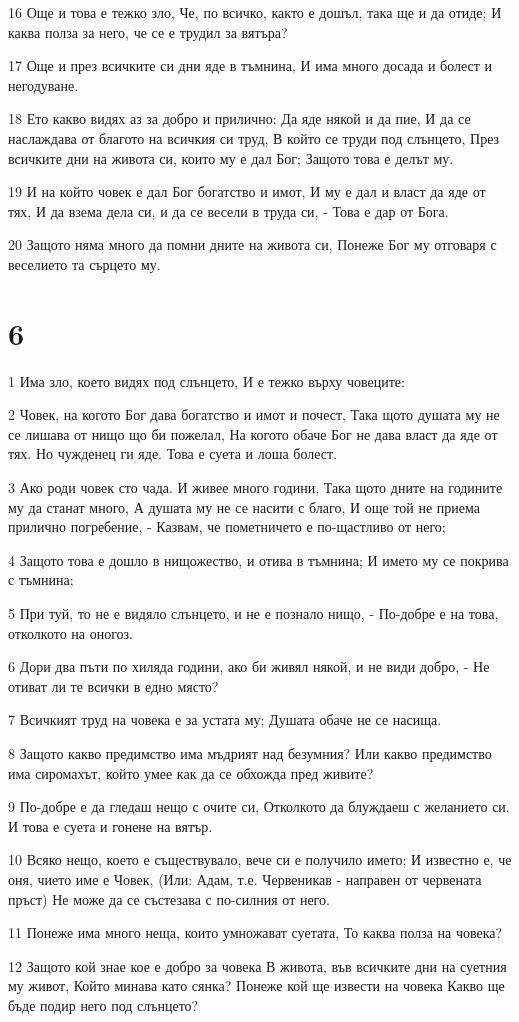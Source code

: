 \par 16 Още и това е тежко зло, Че, по всичко, както е дошъл, така ще и да отиде; И каква полза за него, че се е трудил за вятъра?
\par 17 Още и през всичките си дни яде в тъмнина, И има много досада и болест и негодуване.
\par 18 Ето какво видях аз за добро и прилично: Да яде някой и да пие, И да се наслаждава от благото на всичкия си труд, В който се труди под слънцето, През всичките дни на живота си, които му е дал Бог; Защото това е делът му.
\par 19 И на който човек е дал Бог богатство и имот, И му е дал и власт да яде от тях, И да взема дела си, и да се весели в труда си, - Това е дар от Бога.
\par 20 Защото няма много да помни дните на живота си, Понеже Бог му отговаря с веселието та сърцето му.

\chapter{6}

\par 1 Има зло, което видях под слънцето, И е тежко върху човеците:
\par 2 Човек, на когото Бог дава богатство и имот и почест, Така щото душата му не се лишава от нищо що би пожелал, На когото обаче Бог не дава власт да яде от тях. Но чужденец ги яде. Това е суета и лоша болест.
\par 3 Ако роди човек сто чада. И живее много години, Така щото дните на годините му да станат много, А душата му не се насити с благо, И още той не приема прилично  погребение, - Казвам, че пометничето е по-щастливо от него;
\par 4 Защото това е дошло в нищожество, и отива в тъмнина; И името му се покрива с тъмнина;
\par 5 При туй, то не е видяло слънцето, и не е познало нищо, - По-добре е на това, отколкото на оногоз.
\par 6 Дори два пъти по хиляда години, ако би живял някой, и не види добро, - Не отиват ли те всички в едно място?
\par 7 Всичкият труд на човека е за устата му; Душата обаче не се насища.
\par 8 Защото какво предимство има мъдрият над безумния? Или какво предимство има сиромахът, който умее как да се обхожда пред живите?
\par 9 По-добре е да гледаш нещо с очите си, Отколкото да блуждаеш с желанието си. И това е суета и гонене на вятър.
\par 10 Всяко нещо, което е съществувало, вече си е  получило името; И известно е, че оня, чието име е Човек, (Или: Адам, т.е. Червеникав - направен от червената пръст) Не може да се състезава с по-силния от него.
\par 11 Понеже има много неща, които умножават суетата, То каква полза на човека?
\par 12 Защото кой знае кое е добро за човека В живота, във всичките дни на суетния му живот, Който минава като сянка? Понеже кой ще извести на човека Какво ще бъде подир него под слънцето?

